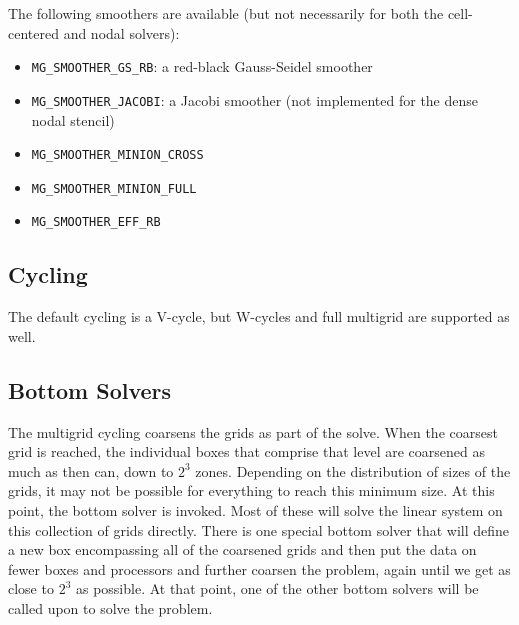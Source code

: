 The following smoothers are available (but not necessarily for both the
cell-centered and nodal solvers):
\begin{itemize}
\item {\tt MG\_SMOOTHER\_GS\_RB}: a red-black Gauss-Seidel smoother

\item {\tt MG\_SMOOTHER\_JACOBI}: a Jacobi smoother (not implemented for 
the dense nodal stencil)

\item {\tt MG\_SMOOTHER\_MINION\_CROSS}

\item {\tt MG\_SMOOTHER\_MINION\_FULL}

\item {\tt MG\_SMOOTHER\_EFF\_RB}
\end{itemize}



\subsection{Cycling}

The default cycling is a V-cycle, but W-cycles and full multigrid are
supported as well.


\subsection{Bottom Solvers}

The multigrid cycling coarsens the grids as part of the solve.  When 
the coarsest grid is reached, the individual boxes that comprise that
level are coarsened as much as then can, down to $2^3$ zones.  Depending
on the distribution of sizes of the grids, it may not be possible for
everything to reach this minimum size.  At this point, the bottom
solver is invoked.  Most of these will solve the linear system
on this collection of grids directly.  There is one special bottom
solver that will define a new box encompassing all of the coarsened
grids and then put the data on fewer boxes and processors and further
coarsen the problem, again until we get as close to $2^3$ as possible.
At that point, one of the other bottom solvers will be called upon
to solve the problem.

